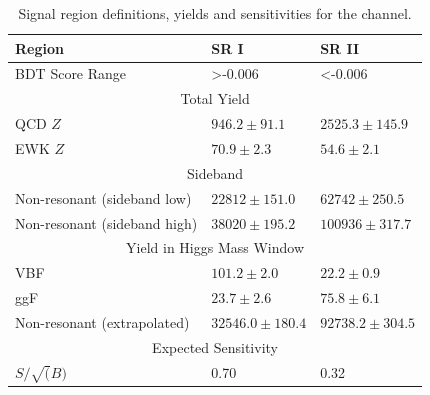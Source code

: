 \begin{table}[htpb]
\centering
\begin{tabular}{|l|l|l|}
\hline
Region                       & SR I                  & SR II                 \\ \hline
BDT Score Range              & \textgreater -0.006    & \textless -0.006       \\ \hline
\multicolumn{3}{|c|}{Total Yield}                                            \\ \hline
QCD $Z$                      & $946.2 \pm 91.1$    & $2525.3 \pm 145.9$  \\ \hline
EWK $Z$                      & $70.9 \pm 2.3$      & $54.6 \pm 2.1$      \\ \hline
\multicolumn{3}{|c|}{Sideband}                                               \\ \hline
Non-resonant (sideband low)  & $22812 \pm 151.0$    & $62742 \pm 250.5 $   \\ \hline
Non-resonant (sideband high) & $38020 \pm 195.2$    & $100936 \pm 317.7 $  \\ \hline
\multicolumn{3}{|c|}{Yield in Higgs Mass Window}                             \\ \hline
VBF                          & $101.2 \pm 2.0$     & $22.2\pm 0.9$       \\ \hline
ggF                          & $23.7 \pm 2.6$      & $75.8\pm 6.1$       \\ \hline
Non-resonant (extrapolated)   & $32546.0 \pm 180.4$ & $92738.2 \pm 304.5$ \\ \hline
\multicolumn{3}{|c|}{Expected Sensitivity}                                   \\ \hline
$S/ \sqrt(B)$                & 0.70                  & 0.32                  \\ \hline
\end{tabular}
\caption{Signal region definitions, yields and sensitivities for the \twocentral channel. }
\label{tab:BDTReg2cen_alt}

\end{table}


